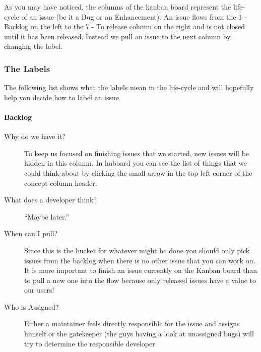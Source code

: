 \documentclass[letterpaper,10pt,english]{sphinxmanual}
\begin{document}
As you may have noticed, the columns of the kanban board represent the
life-cycle of an issue (be it a Bug or an Enhancement). An issue flows from the
1 - Backlog on the left to the 7 - To release column on the right and is not
closed until it has been released. Instead we pull an issue to the next column
by changing the label.


\subsubsection{The Labels}
\label{bugtracker/kanban:the-labels}
The following list shows what the labels mean in the life-cycle and will
hopefully help you decide how to label an issue.


\paragraph{Backlog}
\label{bugtracker/kanban:backlog}\begin{description}
\item[{Why do we have it?}] \leavevmode
To keep us focused on finishing issues that we started, new issues will be
hidden in this column. In huboard you can see the list of things that we could
think about by clicking the small arrow in the top left corner of the concept
column header.

\item[{What does a developer think?}] \leavevmode
``Maybe later.''

\item[{When can I pull?}] \leavevmode
Since this is the bucket for whatever might be done you should only pick
issues from the backlog when there is no other issue that you can work on. It
is more important to finish an issue currently on the Kanban board than to
pull a new one into the flow because only released issues have a value to our
users!

\item[{Who is Assigned?}] \leavevmode
Either a maintainer feels directly responsible for the issue and assigns
himself or the gatekeeper (the guys having a look at unassigned bugs) will try
to determine the responsible developer.

\end{description}
\end{document}
